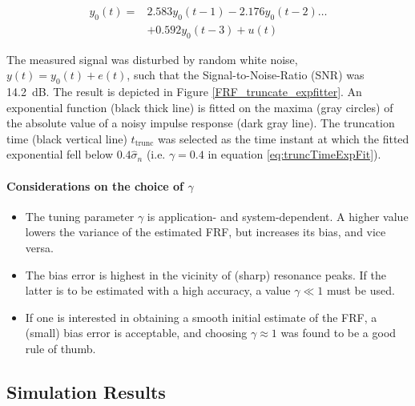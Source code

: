 \begin{align}
%
y_0(t) =& 2.583y_0(t - 1) -2.176y_0(t - 2)\dots \nonumber
\\
&+0.592y_0(t-3) + u(t)
\end{align}

The measured signal was disturbed by random white noise, $y(t) = y_0(t) + e(t)$, such that the Signal-to-Noise-Ratio (SNR) was 14.2~dB.
The result is depicted in Figure \ref{FRF_truncate_expfitter}. An exponential function (black thick line) is fitted on the maxima (gray circles) of the absolute value of a noisy impulse response (dark gray line). The truncation time (black vertical line) $t_\mathrm{trunc}$ was selected as the time instant at which the fitted exponential fell below $0.4\hat\sigma_n$ (i.e. $\gamma = 0.4$ in equation \eqref{eq:truncTimeExpFit}).

\paragraph*{Considerations on the choice of $\gamma$} 

\begin{itemize}
\item The tuning parameter $\gamma$ is application- and system-dependent.  A higher value lowers the variance of the estimated FRF, but increases its bias, and vice versa. 

\item
The bias error is highest in the vicinity of (sharp) resonance peaks. If the latter is to be estimated with a high accuracy, a value $\gamma \ll 1$ must be used. %

\item If one is interested in obtaining a smooth initial estimate of the FRF, a (small) bias error is acceptable, and choosing $\gamma \approx 1$ was found to be a good rule of thumb.
\end{itemize}



\subsection{Simulation Results}\label{se:simResults}

